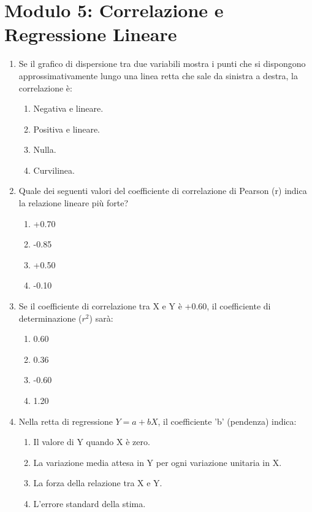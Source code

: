 \documentclass[12pt, a4paper]{article}
\begin{document}
\section*{Modulo 5: Correlazione e Regressione Lineare}
\begin{enumerate}[resume]
    \item Se il grafico di dispersione tra due variabili mostra i punti che si dispongono approssimativamente lungo una linea retta che sale da sinistra a destra, la correlazione è:
    \begin{enumerate}
        \item Negativa e lineare.
        \item Positiva e lineare.
        \item Nulla.
        \item Curvilinea.
    \end{enumerate}
    \vspace{0.3cm}

    \item Quale dei seguenti valori del coefficiente di correlazione di Pearson (r) indica la relazione lineare più forte?
    \begin{enumerate}
        \item +0.70
        \item -0.85
        \item +0.50
        \item -0.10
    \end{enumerate}
    \vspace{0.3cm}

    \item Se il coefficiente di correlazione tra X e Y è +0.60, il coefficiente di determinazione ($r^2$) sarà:
    \begin{enumerate}
        \item 0.60
        \item 0.36
        \item -0.60
        \item 1.20
    \end{enumerate}
    \vspace{0.3cm}

    \item Nella retta di regressione $Y = a + bX$, il coefficiente 'b' (pendenza) indica:
    \begin{enumerate}
        \item Il valore di Y quando X è zero.
        \item La variazione media attesa in Y per ogni variazione unitaria in X.
        \item La forza della relazione tra X e Y.
        \item L'errore standard della stima.
    \end{enumerate}
    \vspace{0.3cm}


\end{enumerate}
\end{document}
